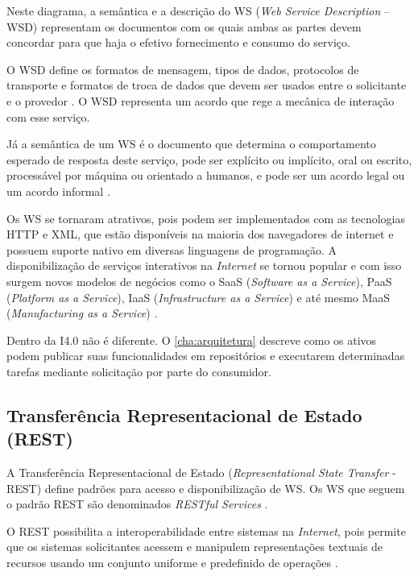 Neste diagrama, a semântica e a descrição do WS (\textit{Web Service Description} -- WSD) representam os documentos com os quais ambas as partes devem concordar para que haja o efetivo fornecimento e consumo do serviço.

O WSD define os formatos de mensagem, tipos de dados, protocolos de transporte e formatos de troca de dados que devem ser usados entre o solicitante e o provedor \cite{booth2004webservice}. O WSD representa um acordo que rege a mecânica de interação com esse serviço.

Já a semântica de um WS é o documento que determina o comportamento esperado de resposta deste serviço, pode ser explícito ou implícito, oral ou escrito, processável por máquina ou orientado a humanos, e pode ser um acordo legal ou um acordo informal \cite{booth2004webservice}.

Os WS se tornaram atrativos, pois podem ser implementados com as tecnologias HTTP e XML, que estão disponíveis na maioria dos navegadores de internet e possuem suporte nativo em diversas linguagens de programação. A disponibilização de serviços interativos na \textit{Internet} se tornou popular e com isso surgem novos modelos de negócios como o SaaS (\textit{Software as a Service}), PaaS (\textit{Platform as a Service}), IaaS (\textit{Infrastructure as a Service}) e até mesmo MaaS (\textit{Manufacturing as a Service}) \cite{annunziata2019maas, nichols2020maas, siepen2019maas}.

Dentro da I4.0 não é diferente. O \autoref{cha:arquitetura} descreve como os ativos podem publicar suas funcionalidades em repositórios e executarem determinadas tarefas mediante solicitação por parte do consumidor.

\subsection{Transferência Representacional de Estado (REST)}
\label{sub:rest}

A Transferência Representacional de Estado (\textit{Representational State Transfer} - REST) define padrões para acesso e disponibilização de WS. Os WS que seguem o padrão REST são denominados \textit{RESTful Services} \cite{fielding2000rest}.

O REST possibilita a interoperabilidade entre sistemas na \textit{Internet}, pois permite que os sistemas solicitantes acessem e manipulem representações textuais de recursos usando um conjunto uniforme e predefinido de operações \cite{booth2004webservice}.

